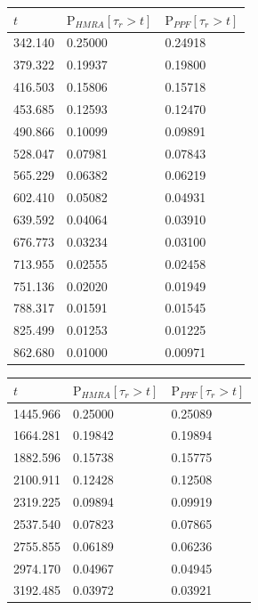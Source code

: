\documentclass[preprint,12pt]{elsarticle}
\numberwithin{equation}{section}
\theoremstyle{plain} \newtheorem{theorem}{Theorem}[section]
\theoremstyle{plain} \newtheorem{proposition}[theorem]{Proposition}
\theoremstyle{plain} \newtheorem{lemma}[theorem]{Lemma}
\theoremstyle{plain} \newtheorem{corollary}[theorem]{Corollary}
\theoremstyle{definition} \newtheorem{definition}[theorem]{Definition}
\theoremstyle{definition} \newtheorem{notation}[theorem]{Notation}
\theoremstyle{remark} \newtheorem{remark}[theorem]{Remark}
\theoremstyle{remark} \newtheorem{remarks}[theorem]{Remarks}
\theoremstyle{remark} \newtheorem{algorithm2}[theorem]{Algorithm}
\theoremstyle{remark} \newtheorem{example}[theorem]{Example}
\begin{document}
\begin{table}[!ht]
   \centering
    {\footnotesize
    \begin{tabular}{|l||l|l|}
    \hline
        $t$ & $\mathrm{P}_{HMRA}[\tau_r>t]$ & $\mathrm{P}_{PPF}[\tau_r>t]$ \\ \hline \hline
        342.140 & 0.25000 & 0.24918 \\ \hline
        379.322 & 0.19937 & 0.19800 \\ \hline
        416.503 & 0.15806 & 0.15718 \\ \hline
        453.685 & 0.12593 & 0.12470 \\ \hline
        490.866 & 0.10099 & 0.09891 \\ \hline
        528.047 & 0.07981 & 0.07843 \\ \hline
        565.229 & 0.06382 & 0.06219 \\ \hline
        602.410 & 0.05082 & 0.04931 \\ \hline
        639.592 & 0.04064 & 0.03910 \\ \hline
        676.773 & 0.03234 & 0.03100 \\ \hline
        713.955 & 0.02555 & 0.02458 \\ \hline
        751.136 & 0.02020 & 0.01949 \\ \hline
        788.317 & 0.01591 & 0.01545 \\ \hline
        825.499 & 0.01253 & 0.01225 \\ \hline
        862.680 & 0.01000 & 0.00971 \\ \hline
    \end{tabular}
    }
    {\footnotesize
    \begin{tabular}{|l||l|l|}
    \hline
        $t$ & $\mathrm{P}_{HMRA}[\tau_r>t]$ & $\mathrm{P}_{PPF}[\tau_r>t]$ \\ \hline \hline
        1445.966 & 0.25000 & 0.25089 \\ \hline
        1664.281 & 0.19842 & 0.19894 \\ \hline
        1882.596 & 0.15738 & 0.15775 \\ \hline
        2100.911 & 0.12428 & 0.12508 \\ \hline
        2319.225 & 0.09894 & 0.09919 \\ \hline
        2537.540 & 0.07823 & 0.07865 \\ \hline
        2755.855 & 0.06189 & 0.06236 \\ \hline
        2974.170 & 0.04967 & 0.04945 \\ \hline
        3192.485 & 0.03972 & 0.03921 \\ \hline

\end{tabular}}
\end{table}
\end{document}
